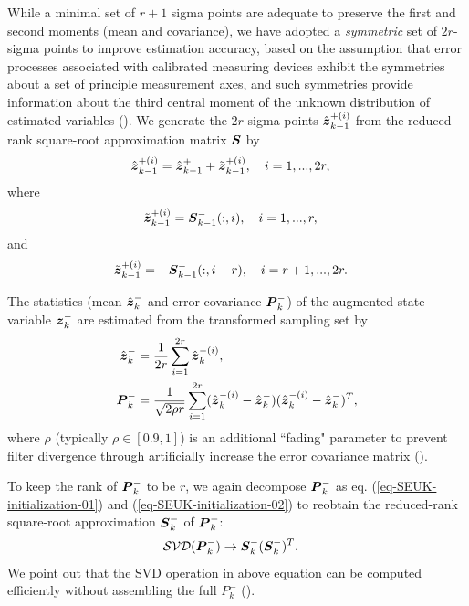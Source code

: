 While a minimal set of $r+1$ sigma points are adequate to preserve the first and second moments (mean and covariance), we have adopted a \emph{symmetric} set of $2r$-sigma points to improve estimation accuracy, based on the assumption that error processes associated with calibrated measuring devices exhibit the symmetries about a set of principle measurement axes, and such symmetries provide information about the third central moment of the unknown distribution of estimated variables (\citealt{Julier2002Reduced}). We generate the $2r$ sigma points $\hat{\vect{z}}_{k-1}^{+(i)}$ from the reduced-rank square-root approximation matrix $\matr{S}$ by
\begin{align}
\hat{\vect{z}}_{k-1}^{+(i)} &= \hat{\vect{z}}_{k-1}^{+} + \tilde{\vect{z}}_{k-1}^{+(i)},\quad i=1,...,2r, \label{eq-unscented-transformation-01}
\end{align}
where
\begin{align}
\tilde{\vect{z}}_{k-1}^{+(i)}&=\matr{S}^{-}_{k-1}(:,i),\quad i=1,...,r,\label{eq-unscented-transformation-02}
\end{align}
and
\begin{align}
\tilde{\vect{z}}_{k-1}^{+(i)}&=-\matr{S}^{-}_{k-1}(:,i-r),\quad i=r+1,...,2r. \label{eq-unscented-transformation-03}
\end{align}

The statistics (mean $\hat{\vect{z}}_k^{-}$ and error covariance $\matr{P}_k^-$) of the augmented state variable $\vect{z}_k^{-}$ are estimated from the transformed sampling set by
\begin{align}
\hat{\vect{z}}_k^{-} &= \frac{1}{2r} \sum_{i=1}^{2r} \hat{\vect{z}}_k^{-(i)},\\
\matr{P}_k^- &= \frac{1}{\sqrt{2 \rho r}}  \sum_{i=1}^{2r} (\hat{\vect{z}}_k^{-(i)}-\hat{\vect{z}}_k^{-}) (\hat{\vect{z}}_k^{-(i)}-\hat{\vect{z}}_k^{-})^T, \label{eq-analysis-error-covariance}
\end{align}
where $\rho$ (typically $\rho \in [0.9,1]$) is an additional ``fading" parameter to prevent filter divergence through artificially increase the error covariance matrix (\citealt{Brasseur2006SEEK}).

To keep the rank of $\matr{P}_k^-$ to be $r$, we again decompose $\matr{P}_k^-$ as eq. (\ref{eq-SEUK-initialization-01}) and (\ref{eq-SEUK-initialization-02}) to reobtain the  reduced-rank square-root approximation $\matr{S}_{k}^-$ of $\matr{P}_k^-$:
\begin{align}
\opSVD(\matr{P}_k^-) &\to  \matr{S}_{k}^- (\matr{S}_{k}^-)^T.
\end{align}
We point out that the SVD operation in above equation can be computed efficiently without assembling the full $P_k^-$ (\citealt{Moireau2010Reduced}).

